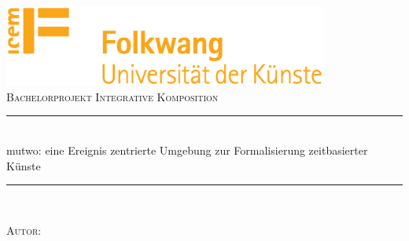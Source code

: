 \documentclass[12pt,a4paper,ngerman]{article}
\begin{document}

\begin{titlepage}

\newcommand{\HRule}{\rule{\linewidth}{0.5mm}} %

\center%
 

\includegraphics[width=0.8\textwidth]{pictures/folk_logoicemCMYKDT}\\[1cm] %
\textsc{\Large Bachelorprojekt Integrative Komposition}\\[0.5cm] %


\HRule\\[0.4cm]
{\huge mutwo: eine Ereignis zentrierte Umgebung zur Formalisierung zeitbasierter Künste}\\[0.2cm]
\HRule\\[1.5cm]
 

\noindent
\begin{minipage}[b]{.25\textwidth}
\end{minipage}%
\begin{minipage}[b]{.25\textwidth}
\begin{flushleft}
\textsc{Autor:}


\end{flushleft}
\end{minipage}
\end{titlepage}
\end{document}
